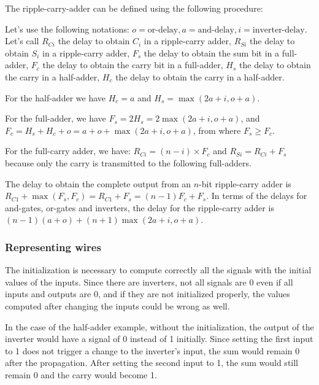 \begin{exe}[3.30]
    The ripple-carry-adder can be defined using the following procedure:

    Let’s use the following notations: $o = \textrm{or-delay}, 
    a = \textrm{and-delay}, i = \textrm{inverter-delay}$.
    Let’s call $R_{Ci}$ the delay to obtain $C_i$ in a ripple-carry adder, 
    $R_{Si}$ the delay to obtain $S_i$ in a ripple-carry adder, $F_s$ the delay 
    to obtain the sum bit in a full-adder, $F_c$ the delay to obtain the carry 
    bit in a full-adder, $H_s$ the delay to obtain the carry in a half-adder, 
    $H_c$ the delay to obtain the carry in a half-adder.

    For the half-adder we have $H_c = a$ and
    $H_s = \max(2a + i, o + a)$.

    For the full-adder, we have $F_s = 2 H_s = 2 \max(2a + i, o + a)$, and $F_c 
    = H_s + H_c + o = a + o + \max(2a + i, o + a)$, from where
    $F_s \geq F_c$.

    For the full-carry adder, we have:
    $R_{Ci} = (n - i) \times F_c$ and $R_{Si} = R_{Ci} + F_s$ because only the 
    carry is transmitted to the following full-adders.

    The delay to obtain the complete output from an $n$-bit ripple-carry adder 
    is $R_{C1} + \max(F_s, F_c) = R_{C1} + F_s = (n - 1) F_c + F_s$. In terms of 
    the delays for and-gates, or-gates and inverters, the delay for the 
    ripple-carry adder is
    $ (n - 1) (a + o) + (n + 1) \max(2a + i, o + a) $.
\end{exe}

\subsubsection{Representing wires}

\begin{exe}[3.31]
    The initialization is necessary to compute correctly all the signals with 
    the initial values of the inputs. Since there are inverters, not all signals 
    are 0 even if all inputs and outputs are 0, and if they are not initialized 
    properly, the values computed after changing the inputs could be wrong as 
    well.

    In the case of the half-adder example, without the initialization, the 
    output of the inverter would have a signal of 0 instead of 1 initially. 
    Since setting the first input to 1 does not trigger a change to the 
    inverter’s input, the sum would remain 0 after the propagation. After 
    setting the second input to 1, the sum would still remain 0 and the carry 
    would become 1.
\end{exe}

